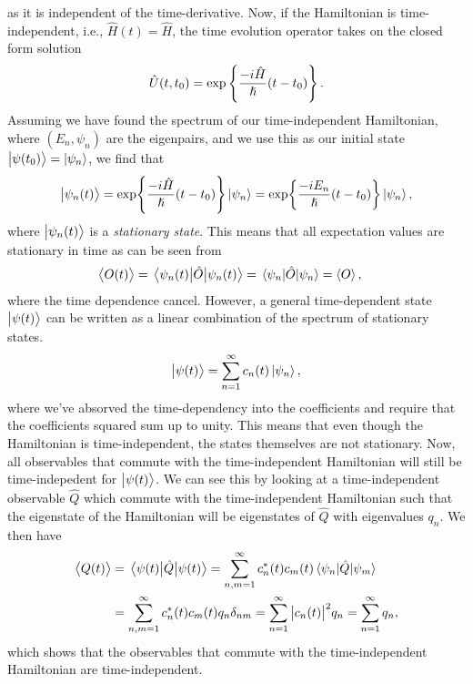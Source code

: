         as it is independent of the time-derivative.
        Now, if the Hamiltonian is time-independent, i.e., $\hat{H}(t) =
        \hat{H}$, the time evolution operator takes on the closed form solution
        \begin{align}
            \hat{U}(t, t_0) = \exp\left\{ 
                \frac{-i \hat{H}}{\hslash} (t - t_0)
             \right\}.
            \label{eq:ti-evolution}
        \end{align}
        Assuming we have found the spectrum of our time-independent Hamiltonian,
        where $(E_n, \psi_n)$ are the eigenpairs, and we use this as our initial
        state $\ket{\psi(t_0)} = \ket{\psi_n}$, we find that
        \begin{gather}
            \ket{\psi_n(t)}
            = \exp{\frac{-i\hat{H}}{\hslash}(t - t_0)}\ket{\psi_n}
            = \exp{\frac{-i E_n}{\hslash} (t - t_0)}\ket{\psi_n},
        \end{gather}
        where $\ket{\psi_n(t)}$ is a \emph{stationary state}.
        This means that all expectation values are stationary in time as can be
        seen from
        \begin{align}
            \expval{O(t)}
            &= \mel{\psi_n(t)}{\hat{O}}{\psi_n(t)}
            = \mel{\psi_n}{\hat{O}}{\psi_n}
            = \expval{O},
        \end{align}
        where the time dependence cancel.
        However, a general time-dependent state $\ket{\psi(t)}$ can be written
        as a linear combination of the spectrum of stationary states.
        \begin{align}
            \ket{\psi(t)} = \sum_{n = 1}^{\infty}c_n(t)\ket{\psi_n},
        \end{align}
        where we've absorved the time-dependency into the coefficients and
        require that the coefficients squared sum up to unity.
        This means that even though the Hamiltonian is time-independent, the
        states themselves are not stationary.
        Now, all observables that commute with the time-independent Hamiltonian
        will still be time-indepedent for $\ket{\psi(t)}$.
        We can see this by looking at a time-independent observable $\hat{Q}$
        which commute with the time-independent Hamiltonian such that the
        eigenstate of the Hamiltonian will be eigenstates of $\hat{Q}$ with
        eigenvalues $q_n$.
        We then have
        \begin{align}
            \expval{Q(t)}
            &= \mel{\psi(t)}{\hat{Q}}{\psi(t)}
            = \sum_{n, m = 1}^{\infty} c^{*}_n(t) c_m(t)
            \mel{\psi_n}{\hat{Q}}{\psi_m}
            \\
            &= \sum_{n, m = 1}^{\infty}
            c^{*}_n(t) c_m(t) q_n \delta_{nm}
            = \sum_{n = 1}^{\infty}
            \abs{c_n(t)}^2 q_n
            = \sum_{n = 1}^{\infty}
            q_n,
        \end{align}
        which shows that the observables that commute with the time-independent
        Hamiltonian are time-independent.


